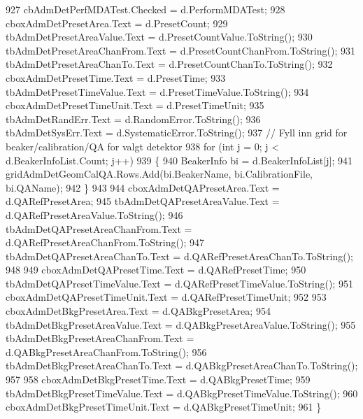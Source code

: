 \begin{DoxyCode}
927             cbAdmDetPerfMDATest.Checked = d.PerformMDATest;
928             cboxAdmDetPresetArea.Text = d.PresetCount;
929             tbAdmDetPresetAreaValue.Text = d.PresetCountValue.ToString();
930             tbAdmDetPresetAreaChanFrom.Text = d.PresetCountChanFrom.ToString();
931             tbAdmDetPresetAreaChanTo.Text = d.PresetCountChanTo.ToString();
932             cboxAdmDetPresetTime.Text = d.PresetTime;
933             tbAdmDetPresetTimeValue.Text = d.PresetTimeValue.ToString();
934             cboxAdmDetPresetTimeUnit.Text = d.PresetTimeUnit;
935             tbAdmDetRandErr.Text = d.RandomError.ToString();
936             tbAdmDetSysErr.Text = d.SystematicError.ToString();
937             \textcolor{comment}{// Fyll inn grid for beaker/calibration/QA for valgt detektor}
938             \textcolor{keywordflow}{for} (\textcolor{keywordtype}{int} j = 0; j < d.BeakerInfoList.Count; j++)
939             \{
940                 BeakerInfo bi = d.BeakerInfoList[j];
941                 gridAdmDetGeomCalQA.Rows.Add(bi.BeakerName, bi.CalibrationFile, bi.QAName);
942             \}
943 
944             cboxAdmDetQAPresetArea.Text = d.QARefPresetArea;
945             tbAdmDetQAPresetAreaValue.Text = d.QARefPresetAreaValue.ToString();
946             tbAdmDetQAPresetAreaChanFrom.Text = d.QARefPresetAreaChanFrom.ToString();
947             tbAdmDetQAPresetAreaChanTo.Text = d.QARefPresetAreaChanTo.ToString();
948 
949             cboxAdmDetQAPresetTime.Text = d.QARefPresetTime;
950             tbAdmDetQAPresetTimeValue.Text = d.QARefPresetTimeValue.ToString();
951             cboxAdmDetQAPresetTimeUnit.Text = d.QARefPresetTimeUnit;
952 
953             cboxAdmDetBkgPresetArea.Text = d.QABkgPresetArea;
954             tbAdmDetBkgPresetAreaValue.Text = d.QABkgPresetAreaValue.ToString();
955             tbAdmDetBkgPresetAreaChanFrom.Text = d.QABkgPresetAreaChanFrom.ToString();
956             tbAdmDetBkgPresetAreaChanTo.Text = d.QABkgPresetAreaChanTo.ToString();
957 
958             cboxAdmDetBkgPresetTime.Text = d.QABkgPresetTime;
959             tbAdmDetBkgPresetTimeValue.Text = d.QABkgPresetTimeValue.ToString();
960             cboxAdmDetBkgPresetTimeUnit.Text = d.QABkgPresetTimeUnit;
961         \}
\end{DoxyCode}
